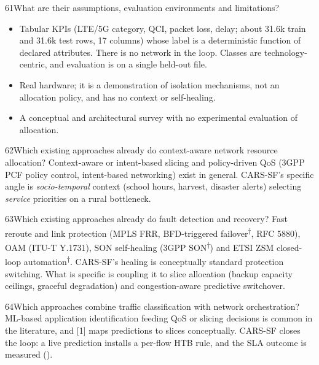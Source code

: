 \begin{qa}{61}{What are their assumptions, evaluation environments and limitations?}
\begin{itemize}
\item [1] Tabular KPIs (LTE/5G category, QCI, packet loss, delay; about 31.6k train and 31.6k test rows, 17 columns)
whose label is a deterministic function of declared attributes. There is no network in the loop. Classes are
technology-centric, and evaluation is on a single held-out file.
\item [2] Real hardware; it is a demonstration of isolation mechanisms, not an allocation policy, and has no context
or self-healing.
\item [3] A conceptual and architectural survey with no experimental evaluation of allocation.
\end{itemize}
\end{qa}

\begin{qa}{62}{Which existing approaches already do context-aware network resource allocation?}
Context-aware or intent-based slicing and policy-driven QoS (3GPP PCF policy control, intent-based networking) exist in
general. CARS-SF's specific angle is \emph{socio-temporal} context (school hours, harvest, disaster alerts) selecting
\emph{service} priorities on a rural bottleneck.
\end{qa}

\begin{qa}{63}{Which existing approaches already do fault detection and recovery?}
Fast reroute and link protection (MPLS FRR, BFD-triggered failover\textsuperscript{†}, RFC 5880), OAM (ITU-T Y.1731),
SON self-healing (3GPP SON\textsuperscript{†}) and ETSI ZSM closed-loop automation\textsuperscript{†}. CARS-SF's healing
is conceptually standard protection switching. What is specific is coupling it to slice allocation (backup capacity
ceilings, graceful degradation) and congestion-aware predictive switchover.
\end{qa}

\begin{qa}{64}{Which approaches combine traffic classification with network orchestration?}
ML-based application identification feeding QoS or slicing decisions is common in the literature, and [1] maps
predictions to slices conceptually. CARS-SF closes the loop: a live prediction installs a per-flow HTB rule, and the
SLA outcome is measured ().
\end{qa}

